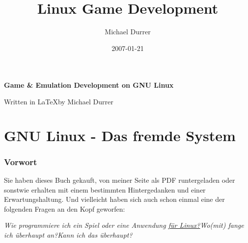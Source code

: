 \documentclass[a4paper,10pt,dvips,fleqn,titlepage,twoside]{book}
\author{Michael Durrer}
\title{Linux Game Development}
\date{2007-01-21}
\begin{document}
\begin{titlepage}
\begin{center}
\begin{huge} \textbf{Game \& Emulation Development on GNU Linux}\end{huge}
\newline
\newline
\begin{small}Written in \LaTeX by Michael Durrer\newline\end{small}
\end{center}
\end{titlepage}
\newpage
\tableofcontents
\setcounter{secnumdepth}{2}

\part{GNU Linux - Das fremde System}
\section{Vorwort}
Sie haben dieses Buch gekauft, von meiner Seite als PDF runtergeladen oder sonstwie erhalten mit einem bestimmten Hintergedanken und einer Erwartungshaltung. Und vielleicht haben sich auch schon einmal eine der folgenden Fragen an den Kopf geworfen:

\begin{flushleft}
\emph{
Wie programmiere ich ein Spiel oder eine Anwendung \underline{f\"{u}r Linux?}\newline Wo(mit) fange ich \"{u}berhaupt an?\newline Kann ich das \"{u}berhaupt?}\newline
\end{flushleft}
\end{document}
